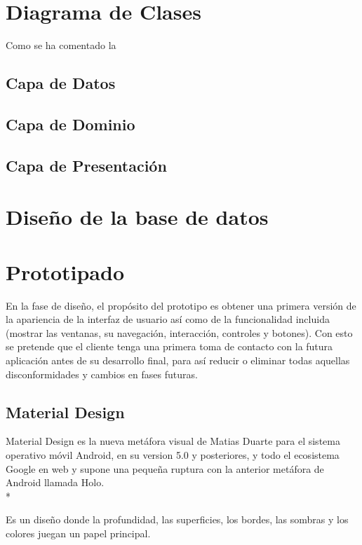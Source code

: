 \documentclass[../pfc.tex]{subfiles}
\begin{document}
	\section{Diagrama de Clases}
	
	Como se ha comentado la
	
	\subsection{Capa de Datos}
	
	\subsection{Capa de Dominio}
	
	\subsection{Capa de Presentación}
	
	\section{Diseño de la base de datos}
	
	\section{Prototipado}
	
	En la fase de diseño, el propósito del prototipo es obtener una primera versión de la apariencia de la interfaz de usuario así como de la funcionalidad incluida (mostrar las ventanas, su navegación, interacción, controles y botones). Con esto se pretende que el cliente tenga una primera toma de contacto con la futura aplicación antes de su desarrollo final, para así reducir o eliminar todas aquellas disconformidades y cambios en fases futuras.
	
		\subsection{Material Design}
		Material Design es la nueva metáfora visual de Matias Duarte para el sistema operativo móvil Android, en su version 5.0 y posteriores, y todo el ecosistema Google en web y supone una pequeña ruptura con la anterior metáfora de Android llamada Holo. \\*
		
		Es un diseño donde la profundidad, las superficies, los bordes, las sombras y los colores juegan un papel principal.
		
\end{document}
